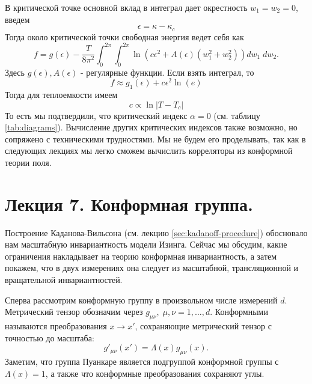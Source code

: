 \documentclass[a4paper,12pt]{article}
\theoremstyle{definition}
\theoremstyle{definition}
\theoremstyle{definition}
\begin{document}
В критической точке основной вклад в интеграл дает окрестность $w_1=w_2=0$, введем
\begin{equation}
  \label{eq:140}
  \epsilon=\kappa-\kappa_c
\end{equation}
Тогда около критической точки свободная энергия ведет себя как
\begin{equation}
  \label{eq:141}
  f=g(\epsilon)-\frac{T}{8\pi^2}\int_{0}^{2\pi}\int_0^{2\pi}\ln \left( c\epsilon^2 +A(\epsilon)(w_1^2+w_2^2)\right)dw_1\;dw_2.
\end{equation}
Здесь $g(\epsilon), A(\epsilon)$ - регулярные функции. Если взять интеграл, то
\begin{equation}
  \label{eq:142}
  f\approx g_1 (\epsilon)+c\epsilon^2 \ln(e)
\end{equation}
Тогда для теплоемкости имеем
\begin{equation}
  \label{eq:143}
  c\propto \ln|T-T_c|
\end{equation}
То есть мы подтвердили, что критический индекс $\alpha=0$ (см. таблицу \ref{tab:diagrams}). Вычисление других критических индексов также возможно, но сопряжено с техническими трудностями. Мы не будем его проделывать, так как в следующих лекциях мы легко сможем вычислить корреляторы из конформной теории поля.
\section{Лекция 7. Конформная группа.}
\label{sec:lecture-7}

Построение Каданова-Вильсона (см. лекцию \ref{sec:kadanoff-procedure}) обосновало нам масштабную инвариантность модели Изинга. Сейчас мы обсудим, какие ограничения накладывает на теорию конформная инвариантность, а затем покажем, что в двух измерениях она следует из масштабной, трансляционной и вращательной инвариантностей.

Сперва рассмотрим конформную группу в произвольном числе измерений $d$. Метрический тензор обозначим через $g_{\mu\nu},\; \mu,\nu=1,\dots,d$. Конформными называются преобразования $x\to x'$, сохраняющие метрический тензор с точностью до масштаба:
\begin{equation}
  \label{eq:123}
  g'_{\mu\nu}(x')=\Lambda(x) g_{\mu\nu}(x).
\end{equation}
Заметим, что группа Пуанкаре является подгруппой конформной группы с $\Lambda(x)=1$, а также что конформные преобразования сохраняют углы. 
\end{document}
